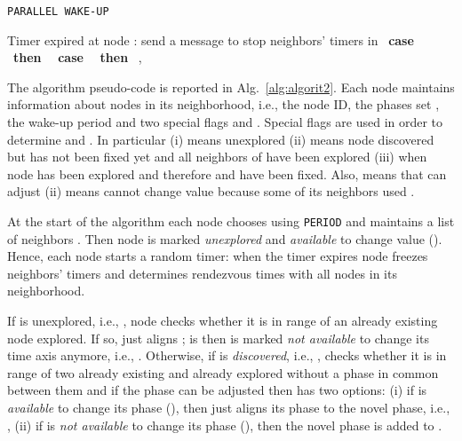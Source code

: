 \begin{algorithm}[t]
\caption{{\tt PARALLEL WAKE-UP}}\label{alg:algorit2}
\begin{algorithmic}[1]
\REQUIRE {}
\FORALL {}
\STATE    
\STATE  {}
\ENDFOR
{}
\STATE Timer expired at node : send a message to stop neighbors' timers in 
\STATE  {}
 \STATE  {}
      \STATE   {}
  \STATE \mbox{ \bf case } \mbox{ \bf then }  \STATE \mbox{ \bf case } \mbox{ \bf then } \STATE     {}
\ENDIF
{}
  \STATE   {}     
  \STATE 
\ELSIF{}  
  \STATE       {} 
\ENDIF  
\STATE 
{}
\STATE ,       
\STATE 
\ENDFOR
\end{algorithmic}
\end{algorithm}


The algorithm pseudo-code is reported in Alg.~\ref{alg:algorit2}. Each node  maintains information 
about nodes in its neighborhood, i.e., the node ID, the phases set , the wake-up period  
and two special flags  and . Special flags are used in order to determine  and . In particular 
(i)  means  unexplored (ii)  means node  discovered but  has not been fixed yet 
and all neighbors of  have been explored (iii)  when node  has been explored and therefore 
 and  have been fixed. Also,  means  that can adjust  (ii)  means 
 cannot change  value because some of its neighbors used . 

At the start of the algorithm each node  chooses  using {\tt PERIOD} and maintains a list of neighbors 
. Then node  is marked {\em unexplored} and {\em available} to change  value (). 
Hence, each node starts a random timer: when the timer expires node  freezes neighbors' timers 
and determines rendezvous times with all nodes in its neighborhood.

If  is unexplored, i.e., , node  checks whether it is in range of an already existing 
node  explored. If so,  just aligns ;  is then is marked {\em not available} 
to change its time axis anymore, i.e., . Otherwise, 
if  is {\em discovered}, i.e., ,  checks whether it is in range of two already existing 
 and  already explored without a phase in common between them and if the phase can be adjusted then 
 has two options: (i) if  is {\em available} to change its phase (), then  just aligns 
its phase to the novel phase, i.e., , (ii) if  is {\em not available} to 
change its phase (), then the novel phase is added to .

